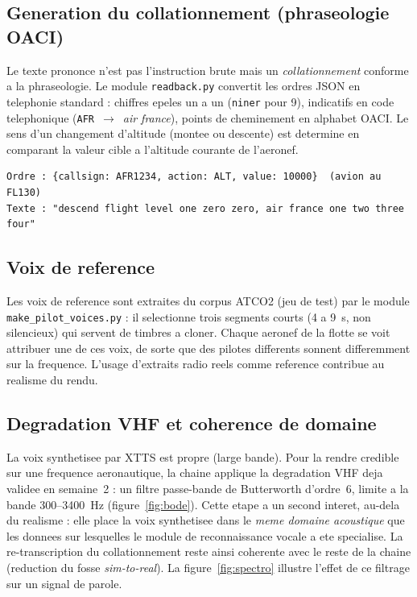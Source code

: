 \documentclass[11pt,a4paper]{article}
\begin{document}
\subsection{Generation du collationnement (phraseologie OACI)}

Le texte prononce n'est pas l'instruction brute mais un \emph{collationnement}
conforme a la phraseologie. Le module \texttt{readback.py} convertit les ordres JSON
en telephonie standard : chiffres epeles un a un (\texttt{niner} pour 9), indicatifs
en code telephonique (\texttt{AFR}~$\rightarrow$~\emph{air france}), points de
cheminement en alphabet OACI. Le sens d'un changement d'altitude (montee ou descente)
est determine en comparant la valeur cible a l'altitude courante de l'aeronef.

\begin{lstlisting}[caption={Exemple de collationnement genere a partir d'un ordre JSON.}]
Ordre : {callsign: AFR1234, action: ALT, value: 10000}  (avion au FL130)
Texte : "descend flight level one zero zero, air france one two three four"
\end{lstlisting}

\subsection{Voix de reference}

Les voix de reference sont extraites du corpus ATCO2 (jeu de test) par le module
\texttt{make\_pilot\_voices.py} : il selectionne trois segments courts (4 a 9~s,
non silencieux) qui servent de timbres a cloner. Chaque aeronef de la flotte se voit
attribuer une de ces voix, de sorte que des pilotes differents sonnent
differemment sur la frequence. L'usage d'extraits radio reels comme reference
contribue au realisme du rendu.

\subsection{Degradation VHF et coherence de domaine}

La voix synthetisee par XTTS est propre (large bande). Pour la rendre credible sur
une frequence aeronautique, la chaine applique la degradation VHF deja validee en
semaine~2 : un filtre passe-bande de Butterworth d'ordre~6, limite a la bande
300--3400~Hz (figure~\ref{fig:bode}). Cette etape a un second interet, au-dela du
realisme : elle place la voix synthetisee dans le \emph{meme domaine acoustique} que
les donnees sur lesquelles le module de reconnaissance vocale a ete specialise. La
re-transcription du collationnement reste ainsi coherente avec le reste de la chaine
(reduction du fosse \emph{sim-to-real}). La figure~\ref{fig:spectro} illustre l'effet
de ce filtrage sur un signal de parole.
\end{document}
